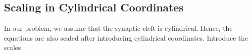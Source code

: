 \documentclass{article}
\begin{document}

\subsection{Scaling in Cylindrical Coordinates}
In our problem, we assume that the synaptic cleft is cylindrical. Hence, the equations are also scaled after introducing cylindrical coordinates. Introduce the scales
\end{document}
